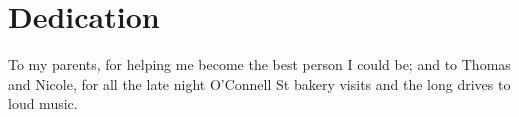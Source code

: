 \chapter{Dedication}
\label{ch:dedication}
To my parents, for helping me become the best person I could be; 
and to Thomas and Nicole, for all the late night O'Connell St bakery visits and the long drives to loud music.


